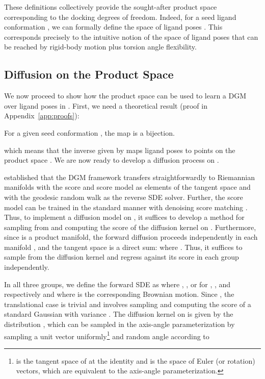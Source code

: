 \documentclass{article} \usepackage{iclr2023_conference,times}
\begin{document}
These definitions collectively provide the sought-after product space corresponding to the docking degrees of freedom. Indeed, for a seed ligand conformation , we can formally define the space of ligand poses . This corresponds precisely to the intuitive notion of the space of ligand poses that can be reached by rigid-body motion plus torsion angle flexibility.

\subsection{Diffusion on the Product Space}

We now proceed to show how the product space can be used to learn a DGM over ligand poses in . First, we need a theoretical result (proof in Appendix~\ref{app:proofs}):
\begin{proposition}
    For a given seed conformation , the map  is a bijection.
\end{proposition}
which means that the inverse  given by  maps ligand poses  to points on the product space . We are now ready to develop a diffusion process on .

\citet{de2022riemannian} established that the DGM framework transfers straightforwardly to Riemannian manifolds with the score and score model as elements of the tangent space and with the geodesic random walk as the reverse SDE solver. Further, the score model can be trained in the standard manner with denoising score matching \citep{song2019generative}. Thus, to implement a diffusion model on , it suffices to develop a method for sampling from and computing the score of the diffusion kernel on . Furthermore, since  is a product manifold, the forward diffusion proceeds independently in each manifold \citep{rodola2019functional}, and the tangent space  is a direct sum:  where . Thus, it suffices to sample from the diffusion kernel and regress against its score in each group independently.

In all three groups, we define the forward SDE as  where , , or  for , , and  respectively and where  is the corresponding Brownian motion. Since , the translational case is trivial and involves sampling and computing the score of a standard Gaussian with variance . The diffusion kernel on  is given by the  distribution \citep{nikolayev1970normal, leach2022denoising}, which can be sampled in the axis-angle parameterization by sampling a unit vector  uniformly\footnote{ is the tangent space of  at the identity and is the space of Euler (or rotation) vectors, which are equivalent to the axis-angle parameterization.} and random angle  according to
\end{document}
